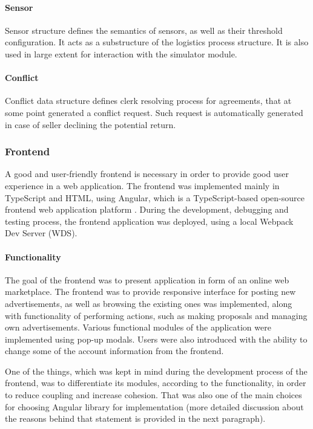 \paragraph{Sensor}
Sensor structure defines the semantics of sensors, as well as their threshold configuration. It acts as a substructure of the logistics process structure. It is also used in large extent for interaction with the simulator module.

\paragraph{Conflict}
Conflict data structure defines clerk resolving process for agreements, that at some point generated a conflict request. Such request is automatically generated in case of seller declining the potential return.

\subsubsection{Frontend} \label{section:frontend}
A good and user-friendly frontend is necessary in order to provide good user experience in a web application. The frontend was implemented mainly in TypeScript and HTML, using Angular, which is a TypeScript-based open-source frontend web application platform \citep{angular}. During the development, debugging and testing process, the frontend application was deployed, using a local Webpack Dev Server (WDS).

\paragraph{Functionality}
The goal of the frontend was to present application in form of an online web marketplace. The frontend was to provide responsive interface for posting new advertisements, as well as browsing the existing ones was implemented, along with functionality of performing actions, such as making proposals and managing own advertisements. Various functional modules of the application were implemented using pop-up modals. Users were also introduced with the ability to change some of the account information from the frontend. 

One of the things, which was kept in mind during the development process of the frontend, was to differentiate its modules, according to the functionality, in order to reduce coupling and increase cohesion. That was also one of the main choices for choosing Angular library for implementation (more detailed discussion about the reasons behind that statement is provided in the next paragraph).

